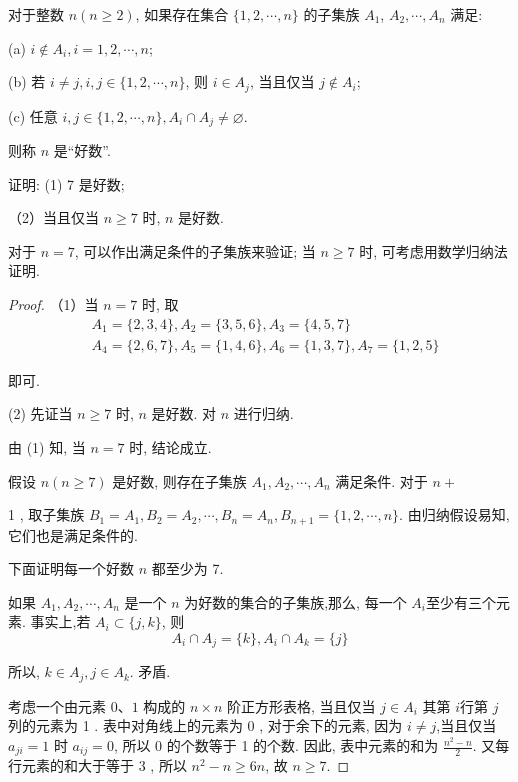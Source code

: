 \begin{example}
	对于整数 $n(n \geqslant 2)$, 如果存在集合 $\{1,2, \cdots, n\}$ 的子集族 $A_{1}$, $A_{2}, \cdots, A_{n}$ 满足:

	(a) $i \notin A_{i}, i=1,2, \cdots, n$;

	(b) 若 $i \neq j, i, j \in\{1,2, \cdots, n\}$, 则 $i \in A_{j}$, 当且仅当 $j \notin A_{i}$;

	(c) 任意 $i, j \in\{1,2, \cdots, n\}, A_{i} \cap A_{j} \neq \varnothing$.

	则称 $n$ 是“好数”.

	证明: (1) 7 是好数;

	（2）当且仅当 $n \geqslant 7$ 时, $n$ 是好数.
\end{example}

\begin{analysis}
	对于 $n=7$, 可以作出满足条件的子集族来验证; 当 $n \geqslant 7$ 时, 可考虑用数学归纳法证明.
\end{analysis}

\begin{proof}
	（1）当 $n=7$ 时, 取
	$$
		\begin{aligned}
			 & A_{1}=\{2,3,4\}, A_{2}=\{3,5,6\}, A_{3}=\{4,5,7\}                  \\
			 & A_{4}=\{2,6,7\}, A_{5}=\{1,4,6\}, A_{6}=\{1,3,7\}, A_{7}=\{1,2,5\}
		\end{aligned}
	$$

	即可.

	(2) 先证当 $n \geqslant 7$ 时, $n$ 是好数. 对 $n$ 进行归纳.

	由 (1) 知, 当 $n=7$ 时, 结论成立.

	假设 $n(n \geqslant 7)$ 是好数, 则存在子集族 $A_{1}, A_{2}, \cdots, A_{n}$ 满足条件. 对于 $n+$

	1 , 取子集族 $B_{1}=A_{1}, B_{2}=A_{2}, \cdots, B_{n}=A_{n}, B_{n+1}=\{1,2, \cdots, n\}$. 由归纳假设易知, 它们也是满足条件的.

	下面证明每一个好数 $n$ 都至少为 7.

	如果 $A_{1}, A_{2}, \cdots, A_{n}$ 是一个 $n$ 为好数的集合的子集族,那么, 每一个 $A_{i}$至少有三个元素. 事实上,若 $A_{i} \subset\{j, k\}$, 则
	$$
		A_{i} \cap A_{j}=\{k\}, A_{i} \cap A_{k}=\{j\}
	$$

	所以, $k \in A_{j}, j \in A_{k}$. 矛盾.

	考虑一个由元素 $0 、 1$ 构成的 $n \times n$ 阶正方形表格, 当且仅当 $j \in A_{i}$ 其第 $i$行第 $j$ 列的元素为 1 . 表中对角线上的元素为 0 , 对于余下的元素, 因为 $i \neq j$,当且仅当 $a_{j i}=1$ 时 $a_{i j}=0$, 所以 0 的个数等于 1 的个数. 因此, 表中元素的和为 $\frac{n^{2}-n}{2}$. 又每行元素的和大于等于 3 , 所以 $n^{2}-n \geqslant 6 n$, 故 $n \geqslant 7$.
\end{proof}

